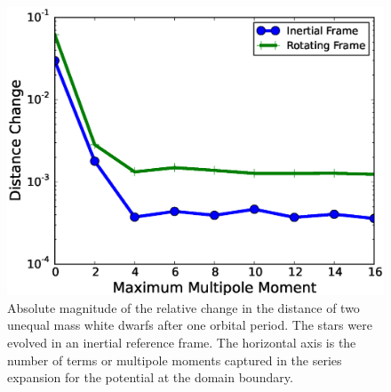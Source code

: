 \documentclass[iop]{../emulateapj}
\begin{document}
\begin{figure}
  \centering
  \includegraphics[scale=0.45]{plots/gravity_bcs}
  \caption{Absolute magnitude of the relative change in the distance of two unequal mass white dwarfs after one orbital period. 
           The stars were evolved in an inertial reference frame. The horizontal axis is the number of terms or multipole moments 
           captured in the series expansion for the potential at the domain boundary.\label{fig:gravity_bcs}}
\end{figure}
\end{document}
